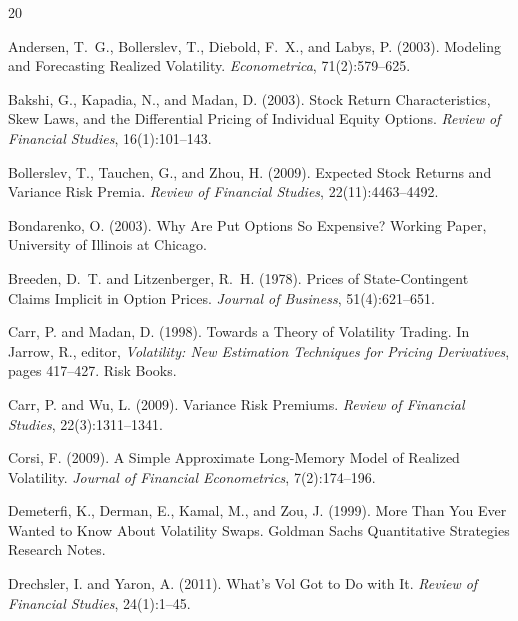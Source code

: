 \documentclass[11pt,a4paper]{article}
\begin{document}
\begin{thebibliography}{20}

Andersen, T.~G., Bollerslev, T., Diebold, F.~X., and Labys, P. (2003).
\newblock Modeling and Forecasting Realized Volatility.
\newblock \textit{Econometrica}, 71(2):579--625.

Bakshi, G., Kapadia, N., and Madan, D. (2003).
\newblock Stock Return Characteristics, Skew Laws, and the Differential Pricing of Individual Equity Options.
\newblock \textit{Review of Financial Studies}, 16(1):101--143.

Bollerslev, T., Tauchen, G., and Zhou, H. (2009).
\newblock Expected Stock Returns and Variance Risk Premia.
\newblock \textit{Review of Financial Studies}, 22(11):4463--4492.

Bondarenko, O. (2003).
\newblock Why Are Put Options So Expensive?
\newblock Working Paper, University of Illinois at Chicago.

Breeden, D.~T. and Litzenberger, R.~H. (1978).
\newblock Prices of State-Contingent Claims Implicit in Option Prices.
\newblock \textit{Journal of Business}, 51(4):621--651.

Carr, P. and Madan, D. (1998).
\newblock Towards a Theory of Volatility Trading.
\newblock In Jarrow, R., editor, \textit{Volatility: New Estimation Techniques for Pricing Derivatives}, pages 417--427. Risk Books.

Carr, P. and Wu, L. (2009).
\newblock Variance Risk Premiums.
\newblock \textit{Review of Financial Studies}, 22(3):1311--1341.

Corsi, F. (2009).
\newblock A Simple Approximate Long-Memory Model of Realized Volatility.
\newblock \textit{Journal of Financial Econometrics}, 7(2):174--196.

Demeterfi, K., Derman, E., Kamal, M., and Zou, J. (1999).
\newblock More Than You Ever Wanted to Know About Volatility Swaps.
\newblock Goldman Sachs Quantitative Strategies Research Notes.

Drechsler, I. and Yaron, A. (2011).
\newblock What's Vol Got to Do with It.
\newblock \textit{Review of Financial Studies}, 24(1):1--45.


\end{thebibliography}
\end{document}
